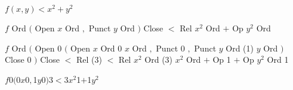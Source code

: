 $f(x,y)<x^2+y^2$

{\obeylines
$f$ Ord
$($ Open
$x$ Ord
$,$ Punct
$y$ Ord
$)$ Close
$<$ Rel
$x^2$ Ord
$+$ Op
$y^2$ Ord
}

{\obeylines
$f$ Ord $($ Open 0
$($ Open $x$ Ord 0
$x$ Ord $,$ Punct 0
$,$ Punct $y$ Ord (1)
$y$ Ord $)$ Close 0
$)$ Close $<$ Rel (3)
$<$ Rel $x^2$ Ord (3)
$x^2$ Ord $+$ Op 1
$+$ Op $y^2$ Ord 1
}

$f$0$($0$x$0$,$1$y$0$)$3$<$3$x^2$1$+$1$y^2$

\bye


